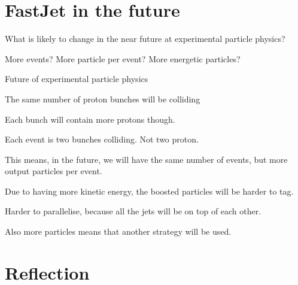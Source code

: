 \section{FastJet in the future}

What is likely to change in the near future at experimental particle physics?

More events? More particle per event? More energetic particles?  

Future of experimental particle physics

The same number of proton bunches will be colliding

Each bunch will contain more protons though.

Each event is two bunches colliding. Not two proton.

This means, in the future, we will have the same number of events, but more output particles per event.

Due to having more kinetic energy, the boosted particles will be harder to tag.

Harder to parallelise, because all the jets will be on top of each other. 

Also more particles means that another strategy will be used.

\section{Reflection}